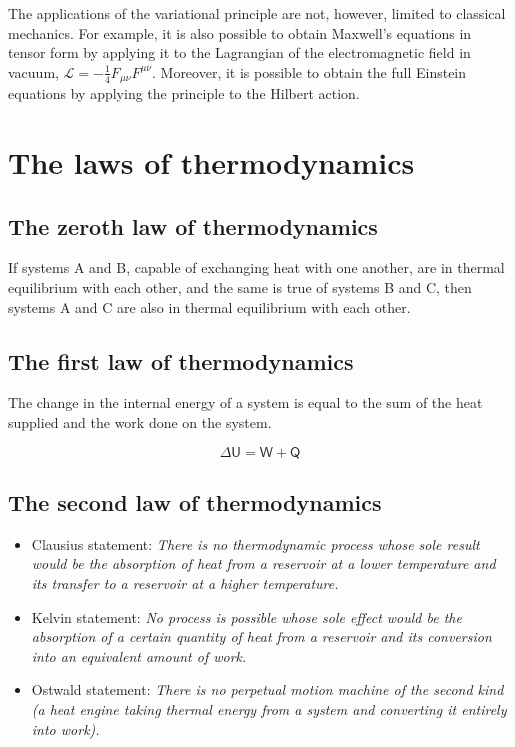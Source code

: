 The applications of the variational principle are not, however, limited to classical mechanics. For example, it is also possible to obtain Maxwell's equations in tensor form by applying it to the Lagrangian of the electromagnetic field in vacuum, $\mathcal{L} = -\frac{1}{4}F_{\mu\nu}F^{\mu\nu}$. Moreover, it is possible to obtain the full Einstein equations by applying the principle to the Hilbert action.

\section{The laws of thermodynamics}

\subsection{The zeroth law of thermodynamics}

If systems A and B, capable of exchanging heat with one another, are in thermal equilibrium with each other, and the same is true of systems B and C, then systems A and C are also in thermal equilibrium with each other.

\subsection{The first law of thermodynamics}

The change in the internal energy of a system is equal to the sum of the heat supplied and the work done on the system.

\begin{equation}
    \Delta\mathsf{U} = \mathsf{W} + \mathsf{Q}
\end{equation}

\subsection{The second law of thermodynamics}

\begin{itemize}
    \item Clausius statement: \textit{There is no thermodynamic process whose sole result would be the absorption of heat from a reservoir at a lower temperature and its transfer to a reservoir at a higher temperature.}
    \item Kelvin statement: \textit{No process is possible whose sole effect would be the absorption of a certain quantity of heat from a reservoir and its conversion into an equivalent amount of work.}
    \item Ostwald statement: \textit{There is no perpetual motion machine of the second kind (a heat engine taking thermal energy from a system and converting it entirely into work).}
\end{itemize}

